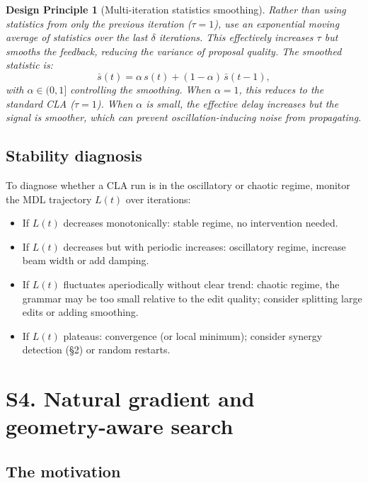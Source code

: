 \documentclass[11pt]{article}
\newtheorem{designprinciple}{Design Principle}
\begin{document}
\begin{designprinciple}[Multi-iteration statistics smoothing]
\label{dp:stats-smoothing}
Rather than using statistics from only the previous iteration ($\tau = 1$), use an exponential moving average of statistics over the last $\delta$ iterations.  This effectively increases $\tau$ but smooths the feedback, reducing the variance of proposal quality.  The smoothed statistic is:
\begin{equation}
  \bar{s}(t) = \alpha \, s(t) + (1 - \alpha) \, \bar{s}(t-1),
  \end{equation}
with $\alpha \in (0, 1]$ controlling the smoothing.  When $\alpha = 1$, this reduces to the standard CLA ($\tau = 1$).  When $\alpha$ is small, the effective delay increases but the signal is smoother, which can prevent oscillation-inducing noise from propagating.
\end{designprinciple}

\subsection{Stability diagnosis}

To diagnose whether a CLA run is in the oscillatory or chaotic regime, monitor the MDL trajectory $L(t)$ over iterations:
\begin{itemize}
  \item If $L(t)$ decreases monotonically: stable regime, no intervention needed.
  \item If $L(t)$ decreases but with periodic increases: oscillatory regime, increase beam width or add damping.
  \item If $L(t)$ fluctuates aperiodically without clear trend: chaotic regime, the grammar may be too small relative to the edit quality; consider splitting large edits or adding smoothing.
  \item If $L(t)$ plateaus: convergence (or local minimum); consider synergy detection (\S2) or random restarts.
\end{itemize}

\section{S4. Natural gradient and geometry-aware search}

\subsection{The motivation}
\end{document}
